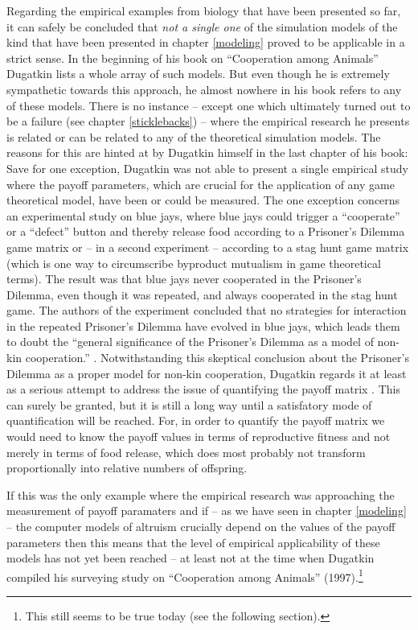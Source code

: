Regarding the empirical examples from biology that have been presented so far,
it can safely be concluded that {\em not a single one} of the simulation
models of the kind that have been presented in chapter \ref{modeling} proved
to be applicable in a strict sense. In the beginning of his book on
``Cooperation among Animals'' \cite[]{dugatkin:1997} Dugatkin lists a whole
array of such models. But even though he is extremely sympathetic towards this
approach, he almost nowhere in his book refers to any of these models.
There is no instance -- except one which ultimately turned out to be a failure
(see chapter \ref{sticklebacks}) -- where the empirical research he presents
is related or can be related to any of the theoretical simulation models. The
reasons for this are hinted at by Dugatkin himself in the last chapter of his
book: Save for one exception, Dugatkin was not able to present a single
empirical study where the payoff parameters, which are crucial for the
application of any game theoretical model, have been or could be measured.
\label{bluejays} The one exception concerns an experimental study on blue jays,
where blue jays could trigger a ``cooperate'' or a ``defect'' button \cite[p.\ 
80/81]{dugatkin:1997} and thereby release food according to a Prisoner's Dilemma
game matrix or -- in a second experiment -- according to a stag hunt game
matrix (which is one way to circumscribe byproduct mutualism in game
theoretical terms). The result was that blue jays never cooperated in the
Prisoner's Dilemma, even though it was repeated, and always cooperated in the
stag hunt game. The authors of the experiment concluded that no strategies for
interaction in the repeated Prisoner's Dilemma have evolved in blue jays,
which leads them to doubt the ``general significance of the Prisoner's Dilemma
as a model of non-kin cooperation.'' \cite[quoted p.\ 80]{dugatkin:1997}.
Notwithstanding this skeptical conclusion about the Prisoner's Dilemma as a
proper model for non-kin cooperation, Dugatkin regards it at least as a
serious attempt to address the issue of quantifying the payoff matrix \cite[p.\ 
165]{dugatkin:1997}.  This can surely be granted, but it is still a long way
until a satisfatory mode of quantification will be reached. For, in
order to quantify the payoff matrix we would need to know the payoff values in
terms of reproductive fitness and not merely in terms of food release, which
does most probably not transform proportionally into relative numbers of
offspring.

If this was the only example where the empirical research was approaching the
measurement of payoff paramaters and if -- as we have seen in chapter
\ref{modeling} -- the computer models of altruism crucially depend on the
values of the payoff parameters then this means that the level of empirical
applicability of these models has not yet been reached -- at least not at the
time when Dugatkin compiled his surveying study on ``Cooperation among
Animals'' (1997).\footnote{This still seems to be true today (see the
  following section).}

